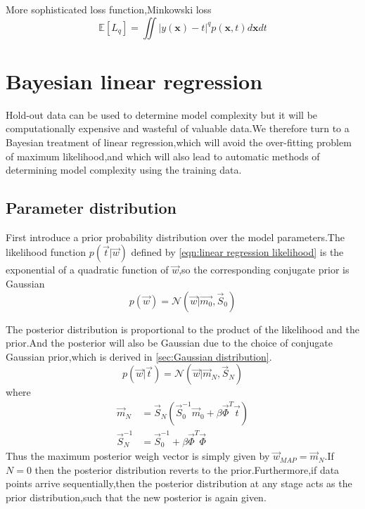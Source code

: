 More sophisticated loss function,Minkowski loss
\begin{equation}
\mathbb{E}[\mathit{L_q}] = \iint| y(\textbf{x}) - t |^q p(\textbf{x},t)d\textbf{x}dt
\end{equation}


\section{Bayesian linear regression}
Hold-out data can be used to determine model complexity but it will be 
computationally expensive and wasteful of valuable data.We therefore turn to a Bayesian treatment of linear regression,which will avoid the over-fitting problem of maximum likelihood,and which will also lead to automatic methods of determining model complexity using the training data.

\subsection{Parameter distribution}
First introduce a prior probability distribution over the model parameters.The likelihood function $p(\vec{t}|\vec{w})$ defined by \ref{eqn:linear regression likelihood} is the exponential of a quadratic function of $\vec{w}$,so the corresponding conjugate prior is
Gaussian
\begin{equation}
p(\vec{w}) = \mathcal{N}(\vec{w}|\vec{m_0},\vec{S}_0)
\end{equation}

The posterior distribution is proportional to the product of the likelihood and the prior.And the posterior will also be Gaussian due to the choice of conjugate Gaussian prior,which is derived in \ref{sec:Gaussian distribution}.
\begin{equation}\label{eqn:Bayes linear regression posterior}
p(\vec{w}|\vec{t}) = \mathcal{N}(\vec{w}|\vec{m}_N,\vec{S}_N)
\end{equation}
where 
\begin{align}
\vec{m}_N &=\vec{S}_N(\vec{S}_0^{-1}\vec{m}_0+\beta\vec{\Phi}^T\vec{t})\\
\vec{S}_N^{-1} &= \vec{S}_0^{-1}+\beta\vec{\Phi}^T\vec{\Phi}
\end{align}
Thus the maximum posterior weigh vector is simply given by $\vec{w}_{MAP}=\vec{m}_{N}$.If $N=0$ then the posterior distribution reverts to the prior.Furthermore,if data points arrive sequentially,then the posterior distribution at any stage acts as the prior distribution,such that the new posterior is again given.


